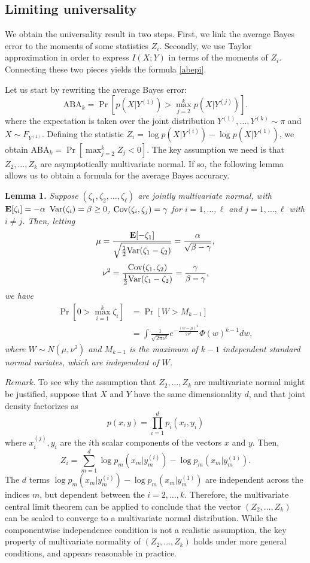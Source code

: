 \subsection{Limiting universality}

We obtain the universality result in two steps.  First, we link the
average Bayes error to the moments of some statistics $Z_i$.
Secondly, we use Taylor approximation in order to express $I(X; Y)$ in
terms of the moments of $Z_i$.  Connecting these two pieces yields the
formula \eqref{abepi}.

Let us start by rewriting the average Bayes error:
\[
\text{ABA}_k = \Pr[p(X|Y^{(1)}) > \max_{j = 2}^k p(X|Y^{(j)})].
\]
where the expectation is taken over the joint distribution
$Y^{(1)},\hdots, Y^{(k)} \sim \pi$ and $X \sim F_{Y^{(1)}}$.  Defining
the statistic $Z_i = \log p(X|Y^{(i)}) - \log p(X|Y^{(1)})$, we obtain
$ \text{ABA}_k = \Pr[\max_{j = 2}^k Z_j < 0].  $ The key assumption we
need is that $Z_2,\hdots, Z_k$ are asymptotically multivariate normal.
If so, the following lemma allows us to obtain a formula for the
average Bayes accuracy.

\textbf{Lemma 1. }
\emph{
Suppose $(\zeta_1, \zeta_2, \hdots, \zeta_\ell)$ are jointly multivariate normal, with 
$\textbf{E}[\zeta_i]= -\alpha$ 
$\text{Var}(\zeta_i) = \beta \geq 0$, 
$\text{Cov}(\zeta_i, \zeta_j) = \gamma$ for $i = 1,\hdots,\ell$ and $j = 1,\hdots, \ell$ with $i \neq j$. 
Then, letting
\[
\mu = \frac{\textbf{E}[-\zeta_1]}{\sqrt{\frac{1}{2}\text{Var}(\zeta_1 - \zeta_2)}} = \frac{\alpha}{\sqrt{\beta - \gamma}},
\]
\[
\nu^2 = \frac{\text{Cov}(\zeta_1, \zeta_2)}{\frac{1}{2}\text{Var}(\zeta_1 - \zeta_2)} = \frac{\gamma}{\beta - \gamma},
\]
we have
\begin{align*}
\Pr[0 > \max_{i=1}^k \zeta_i] &= \Pr[W > M_{k-1}]
\\&= \int \frac{1}{\sqrt{2\pi\nu^2}} e^{-\frac{(w-\mu)^2}{2\nu^2}} \Phi(w)^{k-1} dw,
\end{align*}
where $W \sim N(\mu, \nu^2)$ and $M_{k-1}$ is the maximum of $k-1$
independent standard normal variates, which are independent of $W$.
}

\emph{Remark.}
To see why the assumption that $Z_2,\hdots, Z_k$ are multivariate
normal might be justified, suppose that $X$ and $Y$ have the same
dimensionality $d$, and that joint density factorizes as
\[
p(x, y) = \prod_{i=1}^d p_i(x_i, y_i)
\]
where $x_i^{(j)}, y_i$ are the $i$th scalar components of the vectors $x$ and $y$.
Then,
\[
Z_i = \sum_{m=1}^d \log p_m(x_m | y^{(i)}_m) - \log p_m(x_m | y^{(1)}_m).
\]
The $d$ terms $\log
p_m(x_m | y^{(i)}_m) - \log p_m(x_m | y^{(1)}_m)$ are independent across
the indices $m$, but dependent between the $i = 2,\hdots, k$.
Therefore, the multivariate central limit theorem can be applied to
conclude that the vector $(Z_2,\hdots, Z_k)$ can be scaled to converge
to a multivariate normal distribution.  While the componentwise
independence condition is not a realistic assumption, the key property
of multivariate normality of $(Z_2,\hdots, Z_k)$ holds under more
general conditions, and appears reasonable in practice.

